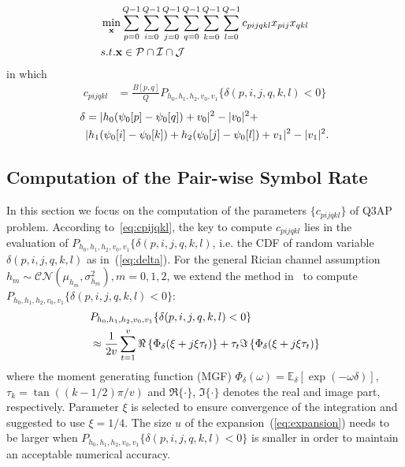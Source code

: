 \documentclass[conference]{IEEEtran}
\begin{document}
\begin{align}
    & \min_{\mathbf{x}}\sum_{p=0}^{Q-1}\sum_{i=0}^{Q-1}\sum_{j=0}^{Q-1}
    \sum_{q=0}^{Q-1}\sum_{k=0}^{Q-1}\sum_{l=0}^{Q-1}c_{pijqkl}x_{pij}x_{qkl}
    \label{eq:Q3AP}\\
    & \mbox{s.t. } \mathbf{x}\in \mathcal{P}\cap\mathcal{I}\cap\mathcal{J}
    \notag
\end{align}
in which
\begin{align}
    c_{pijqkl} & = \frac{B[p, q]}{Q}P_{h_0,h_1,h_2,v_0,v_1}\{\delta(p,i,j,q,k,l)
    < 0\}
    \label{eq:cpijqkl}
\end{align}
\begin{align}
    \delta & = |h_0(\psi_0[p] - \psi_0[q]) + v_0|^2 - |v_0|^2 +\notag
    \\
    &
    |h_1(\psi_0[i] - \psi_0[k])+h_2(\psi_0[j] - \psi_0[l])+v_1|^2 -
    |v_1|^2.\label{eq:delta}
\end{align}

\subsection{Computation of the Pair-wise Symbol Rate}

In this section we focus on the computation of the parameters $\{c_{pijqkl}\}$
of Q3AP problem. According to~\ref{eq:cpijqkl}, the key to compute $c_{pijqkl}$
lies in the evaluation of $P_{h_0,h_1,h_2,v_0,v_1}\{\delta(p,i,j,q,k,l)$, i.e.
the CDF of random variable $\delta(p,i,j,q,k,l)$ as in~(\ref{eq:delta}). For the
general Rician channel assumption
$h_m\sim\mathcal{CN}(\mu_{h_m},\sigma_{h_m}^2), m=0,1,2$, we extend the method
in~\cite{} to compute $P_{h_0,h_1,h_2,v_0,v_1}\{\delta(p,i,j,q,k,l) < 0\}$:
\begin{align}
    & P_{h_0,h_1,h_2,v_0,v_1}\{\delta(p,i,j,q,k,l) < 0\} \notag \\
    & \approx \frac{1}{2v}\sum_{t=1}^v \Re\left\{\Phi_{\delta}(\xi +
    j\xi\tau_t)\right\} + \tau_t\Im\left\{\Phi_{\delta}(\xi +
    j\xi\tau_t)\right\}
    \label{eq:expansion}
\end{align}
where the moment generating function (MGF) $\Phi_{\delta}(\omega) =
\mathbb{E}_{\delta}[\exp(-\omega\delta)]$, $\tau_k = \tan((k - 1/2)\pi/v)$
and $\Re\{\cdot\}$, $\Im\{\cdot\}$ denotes the real and image part,
respectively. Parameter $\xi$ is selected to ensure convergence of the
integration and \cite{taricco2002exact} suggested to use $\xi = 1/4$. The size
$u$ of the expansion~(\ref{eq:expansion}) needs to be larger when $
P_{h_0,h_1,h_2,v_0,v_1}\{\delta(p,i,j,q,k,l) < 0\}$ is smaller in order to
maintain an acceptable numerical accuracy.
\end{document}
